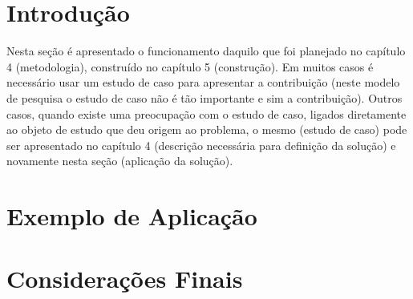 \section{Introdução}
Nesta seção é apresentado o funcionamento daquilo que foi planejado no capítulo 4 (metodologia), construído no capítulo 5 (construção). Em muitos casos é necessário usar um estudo de caso para apresentar a contribuição (neste modelo de pesquisa o estudo de caso não é tão importante e sim a contribuição). Outros casos, quando existe uma preocupação com o estudo de caso, ligados diretamente ao objeto de estudo que deu origem ao problema, o mesmo (estudo de caso) pode ser apresentado no capítulo 4 (descrição necessária para definição da solução) e novamente nesta seção (aplicação da solução). 


\section{Exemplo de Aplicação}

\section{Considerações Finais}


